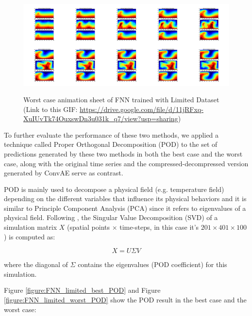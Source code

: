 \begin{figure}[H]
    \centering
    \caption{Worst case animation sheet of FNN trained with Limited Dataset (Link to this GIF: 
    \url{https://drive.google.com/file/d/11jRFxq-XuIUvTk74OuxswDn3u031k_q7/view?usp=sharing})}
    \includegraphics[scale=0.10]{figures/mantle_convection_images/limited_dataset/FNN_Worst_GIF_sheet.png}
    \label{figure:FNN_limited_worst_gif}
\end{figure}

To further evaluate the performance of these two methods, we applied a technique called Proper Orthogonal Decomposition (POD) to the set of predictions generated by these two methods in both the best case and the worst case, along with the original time series and the compressed-decompressed version generated by ConvAE serve as contrast.

POD is mainly used to decompose a physical field (e.g. temperature field) depending on the different variables that influence its physical behaviors and it is similar to Principle Component Analysis (PCA) since it refers to eigenvalues of a physical field.\citep{10.1146_annurev.fl.25.010193.002543} Following \citep{10.1515_9783110671490-007}, the Singular Value Decomposition (SVD) of a simulation matrix $X$ (spatial points × time-steps, in this case it's $201 \times 401 \times 100$) is computed as:

\begin{equation}
X = U\Sigma V
\end{equation}

where the diagonal of $\Sigma$ contains the eigenvalues (POD coefficient) for this simulation.

Figure \ref{figure:FNN_limited_best_POD} and Figure \ref{figure:FNN_limited_worst_POD} show the POD result in the best case and the worst case:

